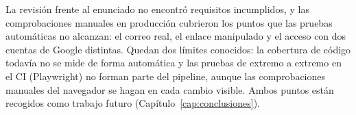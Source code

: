 La revisión frente al enunciado no encontró requisitos incumplidos, y las comprobaciones manuales en producción cubrieron los puntos que las pruebas automáticas no alcanzan: el correo real, el enlace manipulado y el acceso con dos cuentas de Google distintas. Quedan dos límites conocidos: la cobertura de código todavía no se mide de forma automática y las pruebas de extremo a extremo en el CI (Playwright) no forman parte del pipeline, aunque las comprobaciones manuales del navegador se hagan en cada cambio visible. Ambos puntos están recogidos como trabajo futuro (Capítulo~\ref{cap:conclusiones}).

